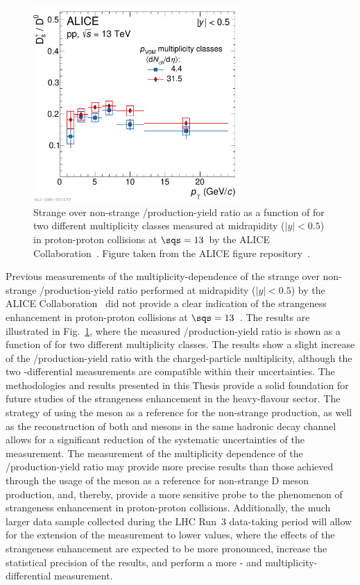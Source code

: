 \begin{figure}[tb]
    \centering
    \includegraphics[width=0.7\textwidth]{Figures/Chapter 9/DsD0Ratios_LowHighMult_V0M_Derived.pdf}
    \caption{Strange over non-strange \ds/\dz production-yield ratio as a function of \pt for two different multiplicity classes measured at midrapidity ($\lvert y\rvert<0.5$) in proton-proton collisions at $\sqs=13$~\tev by the ALICE Collaboration~\cite{ALICE:2021npz}. Figure taken from the ALICE figure repository~\cite{ALICE_figures}.}
    \label{fig:ALICE_DsD0VsMultiplicity}
\end{figure}

Previous measurements of the multiplicity-dependence of the strange over non-strange \ds/\dz production-yield ratio performed at midrapidity ($\lvert y\rvert<0.5$) by the ALICE Collaboration~\cite{ALICE:2021npz} did not provide a clear indication of the strangeness enhancement in proton-proton collisions at $\sqs=13$~\tev. The results are illustrated in Fig.~\ref{fig:ALICE_DsD0VsMultiplicity}, where the measured \ds/\dz production-yield ratio is shown as a function of \pt for two different multiplicity classes. The results show a slight increase of the \ds/\dz production-yield ratio with the charged-particle multiplicity, although the two \pt-differential measurements are compatible within their uncertainties. The methodologies and results presented in this Thesis provide a solid foundation for future studies of the strangeness enhancement in the heavy-flavour sector. The strategy of using the \dpl meson as a reference for the non-strange production, as well as the reconstruction of both \ds and \dpl mesons in the same hadronic decay channel allows for a significant reduction of the systematic uncertainties of the measurement. The measurement of the multiplicity dependence of the \ds/\dpl production-yield ratio may provide more precise results than those achieved through the usage of the \dz meson as a reference for non-strange D meson production, and, thereby, provide a more sensitive probe to the phenomenon of strangeness enhancement in proton-proton collisions. Additionally, the much larger data sample collected during the LHC Run~3 data-taking period will allow for the extension of the measurement to lower \pt values, where the effects of the strangeness enhancement are expected to be more pronounced, increase the statistical precision of the results, and perform a more \pt- and multiplicity-differential measurement.

